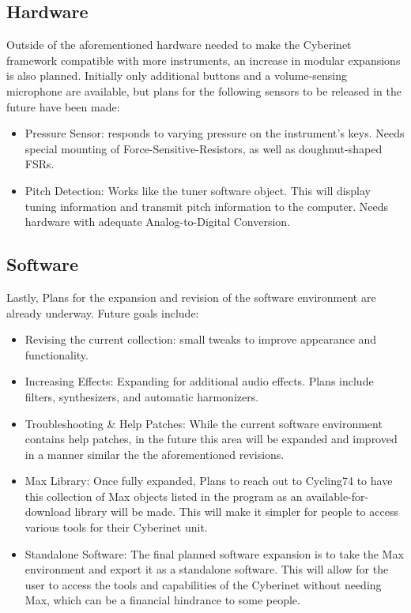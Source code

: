\subsection{Hardware}
Outside of the aforementioned hardware needed to make the Cyberinet framework compatible with more instruments, an increase in modular expansions is also planned. Initially only additional buttons and a volume-sensing microphone are available, but plans for the following sensors to be released in the future have been made:

\begin{itemize}
    \item Pressure Sensor: responds to varying pressure on the instrument's keys. Needs special mounting of Force-Sensitive-Resistors, as well as doughnut-shaped FSRs.
    \item Pitch Detection: Works like the tuner software object. This will display tuning information and transmit pitch information to the computer. Needs hardware with adequate Analog-to-Digital Conversion.
\end{itemize}

\subsection{Software}
Lastly, Plans for the expansion and revision of the software environment are already underway. Future goals include:
\begin{itemize}
    \item Revising the current collection: small tweaks to improve appearance and functionality.
    \item Increasing Effects: Expanding for additional audio effects. Plans include filters, synthesizers, and automatic harmonizers.
    \item Troubleshooting \& Help Patches: While the current software environment contains help patches, in the future this area will be expanded and improved in a manner similar the the aforementioned revisions.
    \item Max Library: Once fully expanded, Plans to reach out to Cycling74 to have this collection of Max objects listed in the program as an available-for-download library will be made. This will make it simpler for people to access various tools for their Cyberinet unit.
    \item Standalone Software: The final planned software expansion is to take the Max environment and export it as a standalone software. This will allow for the user to access the tools and capabilities of the Cyberinet without needing Max, which can be a financial hindrance to some people.
\end{itemize}



